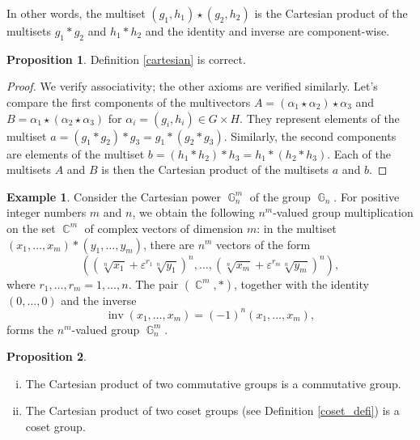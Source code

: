 \documentclass[14pt, dvipsnames]{extarticle}
\theoremstyle{definition}
\newtheorem{prop}{Proposition}
\theoremstyle{definition}
\newtheorem{example}{\bf Example}
\theoremstyle{remark}
\DeclareMathOperator{\G}{\mathbb{G}}
\DeclareMathOperator{\inv}{\mathrm{inv}}
\DeclareMathOperator{\Cc}{\mathbb{C}}
\renewcommand{\epsilon}{\varepsilon}
\begin{document}
In other words, the multiset $(g_1, h_1) \star (g_2, h_2)$ is the Cartesian product of the multisets $g_1 \ast g_2$ and $h_1 \ast h_2$ and the identity and inverse are component-wise.

\begin{prop}
Definition \ref{cartesian} is correct.
\end{prop}

\begin{proof}
We verify associativity; the other axioms are verified similarly. Let’s compare the first components of the multivectors $A = (\alpha_1 \star \alpha_2) \star \alpha_3$ and $B = \alpha_1 \star (\alpha_2 \star \alpha_3)$ for $\alpha_i = (g_i, h_i) \in G \times H$. They represent elements of the multiset $a = (g_1 \ast g_2) \ast g_3 = g_1 \ast (g_2 \ast g_3)$. Similarly, the second components are elements of the multiset $b = (h_1 \ast h_2) \ast h_3 = h_1 \ast (h_2 \ast h_3)$. Each of the multisets $A$ and $B$ is then the Cartesian product of the multisets $a$ and $b$.
\end{proof}

\begin{example}\label{G_n^m}
Consider the Cartesian power $\G_n^m$ of the group $\G_n$. For positive integer numbers $m$ and $n$, we obtain the following $n^m$-valued group multiplication on the set $\Cc^m$ of complex vectors of dimension $m$: in the multiset $(x_1, \dots, x_m) \ast (y_1, \dots, y_m)$, there are $n^m$ vectors of the form
$$ \left( (\sqrt[n]{x_1} + \epsilon^{r_1} \sqrt[n]{y_1})^n, \dots, (\sqrt[n]{x_m} + \epsilon^{r_m} \sqrt[n]{y_m})^n \right),$$ where $r_1, \dots, r_m = 1, \dots, n.$
The pair $(\Cc^m, \ast)$, together with the identity $(0, \dots, 0)$ and the inverse
$$ \inv(x_1, \dots, x_m) = (-1)^n(x_1, \dots, x_m), $$
forms the $n^m$-valued group $\G_n^m$.
\end{example}

\begin{prop}
\begin{enumerate}[(i)]
\item The Cartesian product of two commutative groups is a commutative group.

\item The Cartesian product of two coset groups (see Definition \ref{coset_defi}) is a coset group.
\end{enumerate}
\end{prop}
\end{document}
